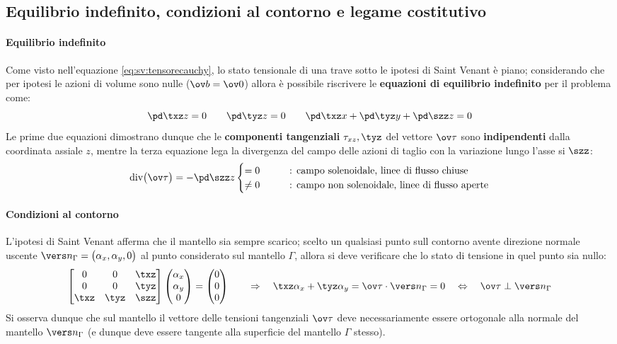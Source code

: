 	\subsection{Equilibrio indefinito, condizioni al contorno e legame costitutivo} \label{sec:sv:equilibrioindefinito}
		\paragraph{Equilibrio indefinito} Come visto nell'equazione \ref{eq:sv:tensorecauchy}, lo stato tensionale di una trave sotto le ipotesi di Saint Venant è piano; considerando che per ipotesi le azioni di volume sono nulle ($\ov b=\ov0$) allora è possibile riscrivere le \textbf{equazioni di equilibrio indefinito} per il problema come:
		\[ \pd \txz z = 0 \qquad \pd \tyz z = 0 \qquad \pd \txz x + \pd \tyz y + \pd \szz z = 0 \]
		Le prime due equazioni dimostrano dunque che le \textbf{componenti tangenziali} $\tau_{xz},\tyz$ del vettore $\ov \tau$ sono \textbf{indipendenti} dalla coordinata assiale $z$, mentre la terza equazione lega la divergenza del campo delle azioni di taglio con la variazione lungo l'asse si $\szz$:
		\[ \textrm{div} \big(\ov \tau \big) = - \pd \szz z \begin{cases}
			= 0 \qquad & \textrm{: campo solenoidale, linee di flusso chiuse} \\
			\neq 0 \qquad & \textrm{: campo non solenoidale, linee di flusso aperte} \\
		\end{cases} \]
	
		\paragraph{Condizioni al contorno} L'ipotesi di Saint Venant afferma che il mantello sia sempre scarico; scelto un qualsiasi punto sull contorno avente direzione normale uscente $\vers n_\Gamma = \big(\alpha_x,\alpha_y,0\big)$ al punto considerato sul mantello $\Gamma$, allora si deve verificare che lo stato di tensione in quel punto sia nullo:
		\[  \begin{bmatrix} 
			0 & 0 & \txz \\ 0 & 0 & \tyz \\ \txz & \tyz & \szz
		\end{bmatrix} \begin{pmatrix}
			\alpha_x \\ \alpha_y \\ 0 
		\end{pmatrix} = \begin{pmatrix}
			0 \\ 0 \\ 0
		\end{pmatrix} \qquad \Rightarrow\quad \txz \alpha_x + \tyz \alpha_y = \ov \tau \cdot \vers n_\Gamma = 0 \quad \Leftrightarrow \quad \ov \tau \perp \vers n_\Gamma \]
		Si osserva dunque che sul mantello il vettore delle tensioni tangenziali $\ov \tau$ deve necessariamente essere ortogonale alla normale del mantello $\vers n_\Gamma$ (e dunque deve essere tangente alla superficie del mantello $\Gamma$ stesso).
		
